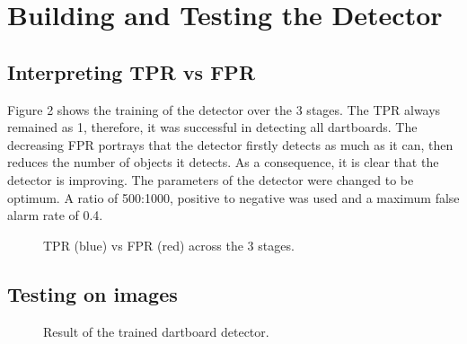 \documentclass[a4paper]{article}
\begin{document}
\section*{Building and Testing the Detector}
\subsection*{Interpreting TPR vs FPR}
\vspace{-0.7em}

Figure 2 shows the training of the detector over the 3 stages. The TPR always
remained as 1, therefore, it was successful in detecting all dartboards. The
decreasing FPR portrays that the detector firstly detects as much as it can,
then reduces the number of objects it detects. As a consequence, it is clear
that the detector is improving. The parameters of the detector were changed to
be optimum. A ratio of 500:1000, positive to negative was used and a maximum
false alarm rate of 0.4.

\begin{figure}[H]
  \centering
  \caption{TPR (blue) vs FPR (red) across the 3 stages.}
\end{figure}

\subsection*{Testing on images}
\vspace{-0.7em}

\begin{figure}[H]
  \centering
  \hfill
   \hfill
   \hfill
   \hfill
   \caption{Result of the trained dartboard detector.}
\end{figure}
\end{document}
